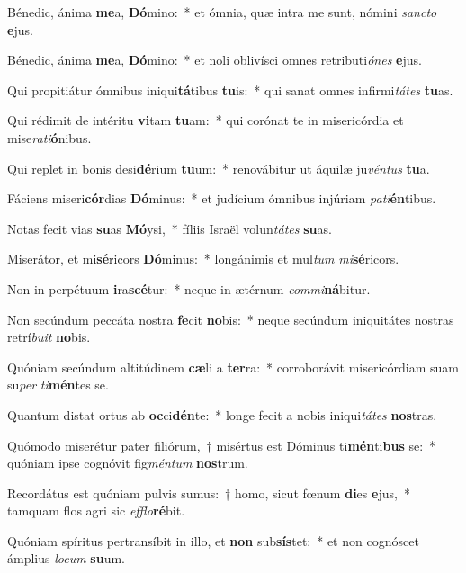 \item Bénedic, ánima \textbf{me}a, \textbf{Dó}mino:~* et ómnia, quæ intra me sunt, nómini \textit{sanc}\textit{to} \textbf{e}jus.
\item Bénedic, ánima \textbf{me}a, \textbf{Dó}mino:~* et noli oblivísci omnes retributi\textit{ó}\textit{nes} \textbf{e}jus.
\item Qui propitiátur ómnibus iniqui\textbf{tá}tibus \textbf{tu}is:~* qui sanat omnes infirmi\textit{tá}\textit{tes} \textbf{tu}as.
\item Qui rédimit de intéritu \textbf{vi}tam \textbf{tu}am:~* qui corónat te in misericórdia et mise\textit{ra}\textit{ti}\textbf{ó}nibus.
\item Qui replet in bonis desi\textbf{dé}rium \textbf{tu}um:~* renovábitur ut áquilæ ju\textit{vén}\textit{tus} \textbf{tu}a.
\item Fáciens miseri\textbf{cór}dias \textbf{Dó}minus:~* et judícium ómnibus injúriam \textit{pa}\textit{ti}\textbf{én}tibus.
\item Notas fecit vias \textbf{su}as \textbf{Mó}ysi,~* fíliis Israël volun\textit{tá}\textit{tes} \textbf{su}as.
\item Miserátor, et mi\textbf{sé}ricors \textbf{Dó}minus:~* longánimis et mul\textit{tum} \textit{mi}\textbf{sé}ricors.
\item Non in perpétuum \textbf{i}ra\textbf{scé}tur:~* neque in ætérnum \textit{com}\textit{mi}\textbf{ná}bitur.
\item Non secúndum peccáta nostra \textbf{fe}cit \textbf{no}bis:~* neque secúndum iniquitátes nostras retrí\textit{bu}\textit{it} \textbf{no}bis.
\item Quóniam secúndum altitúdinem \textbf{cæ}li a \textbf{ter}ra:~* corroborávit misericórdiam suam su\textit{per} \textit{ti}\textbf{mén}tes se.
\item Quantum distat ortus ab \textbf{oc}ci\textbf{dén}te:~* longe fecit a nobis iniqui\textit{tá}\textit{tes} \textbf{nos}tras.
\item Quómodo miserétur pater filiórum,~† misértus est Dóminus ti\textbf{mén}ti\textbf{bus} se:~* quóniam ipse cognóvit fig\textit{mén}\textit{tum} \textbf{nos}trum.
\item Recordátus est quóniam pulvis sumus:~† homo, sicut fœnum \textbf{di}es \textbf{e}jus,~* tamquam flos agri sic \textit{ef}\textit{flo}\textbf{ré}bit.
\item Quóniam spíritus pertransíbit in illo, et \textbf{non} sub\textbf{sís}tet:~* et non cognóscet ámplius \textit{lo}\textit{cum} \textbf{su}um.
